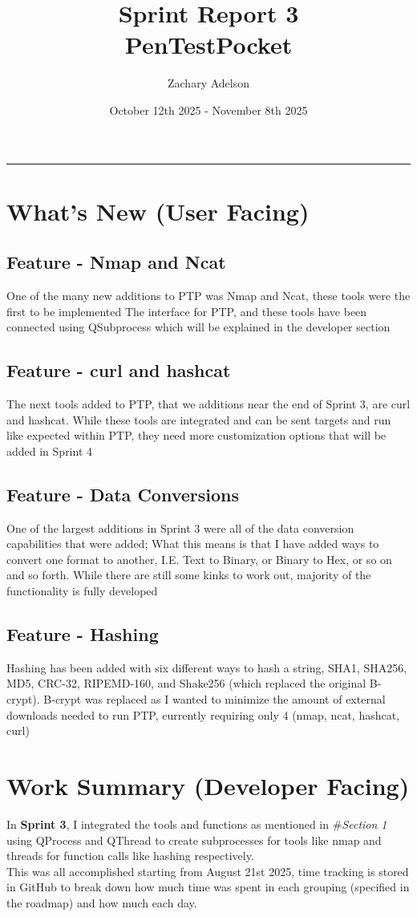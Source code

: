\documentclass{article}
\title{Sprint Report 3\\\small{PenTestPocket}}
\author{Zachary Adelson}
\date{October 12th 2025 - November 8th 2025}
\begin{document}
\maketitle
\rule{10cm}{0.25pt}
\centering

\section{What's New (User Facing)}
\subsection{Feature - Nmap and Ncat} One of the many new additions to PTP was Nmap and Ncat, these tools were the first to be implemented The interface for PTP, and these tools have been connected using QSubprocess which will be explained in the developer section

\subsection{Feature - curl and hashcat} The next tools added to PTP, that we additions near the end of Sprint 3, are curl and hashcat. While these tools are integrated and can be sent targets and run like expected within PTP, they need more customization options that will be added in Sprint 4

\subsection{Feature - Data Conversions} One of the largest additions in Sprint 3 were all of the data conversion capabilities that were added; What this means is that I have added ways to convert one format to another, I.E. Text to Binary, or Binary to Hex, or so on and so forth. While there are still some kinks to work out, majority of the functionality is fully developed 

\subsection{Feature - Hashing} Hashing has been added with six different ways to hash a string, SHA1, SHA256, MD5, CRC-32, RIPEMD-160, and Shake256 (which replaced the original B-crypt). B-crypt was replaced as I wanted to minimize the amount of external downloads needed to run PTP, currently requiring only 4 (nmap, ncat, hashcat, curl)
\newpage
\section{Work Summary (Developer Facing)}
\large{
In \textbf{Sprint 3}, I integrated the tools and functions as mentioned in \#\textit{Section 1} using QProcess and QThread to create subprocesses for tools like nmap and threads for function calls like hashing respectively.\\ This was all accomplished starting from August 21st 2025, time tracking is stored in GitHub to break down how much time was spent in each grouping (specified in the roadmap) and how much each day.
}
\newpage
\end{document}
